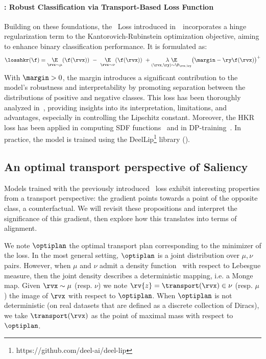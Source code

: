 \paragraph{\hkr: Robust Classification via Transport-Based Loss Function}

Building on these foundations, the \hkr~Loss introduced in~\cite{serrurier2021achieving}~incorporates a hinge regularization term to the Kantorovich-Rubinstein optimization objective, aiming to enhance binary classification performance. It is formulated as:
\begin{equation}
    \losshkr(\f) = 
    \underset{\rvx \sim \mu}{\E}(\f(\rvx)) ~ - ~ \underset{\rvx \sim \nu}{\E}(\f(\rvx)) 
    ~ +  \underset{(\rvx, \ry) \sim \P_{\rvx, \ry}}{\lambda ~ \E}\big(\margin - \ry \f(\rvx)\big)^+
\end{equation}
With $\margin > 0$, the margin introduces a significant contribution to the model's robustness and interpretability by promoting separation between the distributions of positive and negative classes. This loss has been thoroughly analyzed in~\cite{bethune2022pay}, providing insights into its interpretation, limitations, and advantages, especially in controlling the Lipschitz constant. Moreover, the HKR loss has been applied in computing SDF functions~\cite{bethune2023robust} and in DP-training~\cite{bethune2023dp}. In practice, the model is trained using the DeelLip\footnote{https://github.com/deel-ai/deel-lip} library (\cite{deelLip}).

\subsection{An optimal transport perspective of Saliency}
\label{sec:lipschitz:theory}

Models trained with the previously introduced \hkr~loss exhibit interesting properties from a transport perspective: the gradient points towards a point of the opposite class, a counterfactual. We will revisit these propositions and interpret the significance of this gradient, then explore how this translates into terms of alignment.

We note $\optiplan$ the optimal transport plan corresponding to the minimizer of the \hkr loss. In the most general setting, $\optiplan$ is a joint distribution over $\mu,\nu$ pairs. However, when $\mu$ and $\nu$ admit a density function~\cite{peyre2018computational} with respect to Lebesgue measure, then the joint density describes a deterministic mapping, i.e. a Monge map. Given $\rvx \sim \mu$ 
(resp. $\nu$) we note $\rv{z} = \transport(\rvx) \in \nu$ (resp. $\mu$) the image of $\rvx$ with respect to $\optiplan$. When $\optiplan$ is not deterministic (on real datasets that are defined as a discrete collection of Diracs), we take $\transport(\rvx)$ as the point of maximal mass with respect to $\optiplan$.

